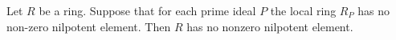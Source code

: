 Let $R$ be a ring. Suppose that for each prime ideal $P$ the local ring
$R_P$ has no non-zero nilpotent element. Then $R$ has no nonzero nilpotent
element.
